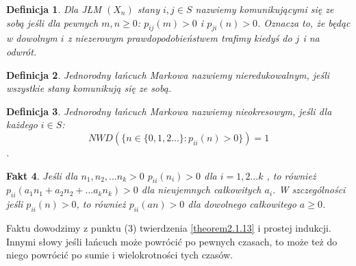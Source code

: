 \documentclass[a4paper]{article}
\theoremstyle{defn}
\newtheorem{defn}{Definicja}[subsection]
\theoremstyle{theorem}
\theoremstyle{lemma}
\theoremstyle{cor}
\theoremstyle{fact}
\newtheorem{fact}[defn]{Fakt}
\begin{document}
\begin{defn}\label{defn2.1.15}
Dla JŁM $(X_n)$ stany $i,j \in S$ nazwiemy \textit{komunikującymi się ze sobą} jeśli dla pewnych $m,n \geq 0$: $p_{ij}(m) > 0$ i $p_{ji}(n) > 0$.
Oznacza to, że będąc w dowolnym $i$ z niezerowym prawdopodobieństwem trafimy kiedyś do $j$ i na odwrót.
\end{defn}
\begin{defn}\label{defn2.1.16}
Jednorodny łańcuch Markowa nazwiemy nieredukowalnym, jeśli wszystkie stany komunikują się ze sobą.
\end{defn}
\begin{defn}\label{defn2.1.17}
Jednorodny łańcuch Markowa nazwiemy nieokresowym, jeśli dla każdego $i \in S$: $$NWD(\{n \in \{0, 1, 2...\}:  p_{ii}(n) > 0\}) = 1$$.
\end{defn}
\begin{fact}\label{fact2.1.18}
Jeśli dla $n_1, n_2, ... n_k > 0$ $p_{ii}(n_i) > 0$ dla $i=1,2...k$ , to również $p_{ii}(a_1n_1 + a_2n_2 + ... a_kn_k) > 0$ dla nieujemnych całkowitych $a_i$. W szczególności jeśli $p_{ii}(n) > 0$, to również $p_{ii}(an) > 0$ dla dowolnego całkowitego $a \geq 0$.
\end{fact}
Faktu dowodzimy z punktu (3) twierdzenia \ref{theorem2.1.13} i prostej indukcji. Innymi słowy jeśli łańcuch może powrócić po pewnych czasach, to może też do niego powrócić po sumie i wielokrotności tych czasów.
\end{document}
